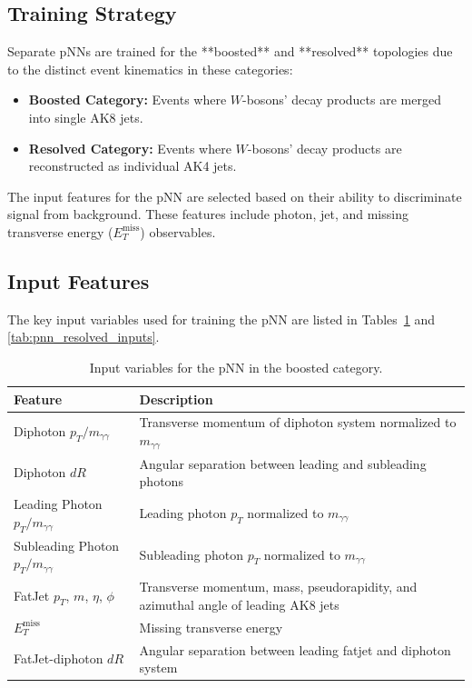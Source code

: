 \subsection{Training Strategy}
Separate pNNs are trained for the **boosted** and **resolved** topologies due to the distinct event kinematics in these categories:
\begin{itemize}
    \item \textbf{Boosted Category:} Events where \(W\)-bosons' decay products are merged into single AK8 jets.
    \item \textbf{Resolved Category:} Events where \(W\)-bosons' decay products are reconstructed as individual AK4 jets.
\end{itemize}

The input features for the pNN are selected based on their ability to discriminate signal from background. These features include photon, jet, and missing transverse energy (\(E_T^{\text{miss}}\)) observables.

\subsection{Input Features}
The key input variables used for training the pNN are listed in Tables~\ref{tab:pnn_boosted_inputs} and \ref{tab:pnn_resolved_inputs}.

\begin{table}[h!]
    \centering
    \caption{Input variables for the pNN in the boosted category.}
    \label{tab:pnn_boosted_inputs}
    \begin{tabular}{ll}
        \hline
        \textbf{Feature} & \textbf{Description} \\
        \hline
        Diphoton \(p_T/m_{\gamma\gamma}\) & Transverse momentum of diphoton system normalized to \(m_{\gamma\gamma}\) \\
        Diphoton \(dR\) & Angular separation between leading and subleading photons \\
        Leading Photon \(p_T/m_{\gamma\gamma}\) & Leading photon \(p_T\) normalized to \(m_{\gamma\gamma}\) \\
        Subleading Photon \(p_T/m_{\gamma\gamma}\) & Subleading photon \(p_T\) normalized to \(m_{\gamma\gamma}\) \\
        FatJet \(p_T\), \(m\), \(\eta\), \(\phi\) & Transverse momentum, mass, pseudorapidity, and azimuthal angle of leading AK8 jets \\
        \(E_T^{\text{miss}}\) & Missing transverse energy \\
        FatJet-diphoton \(dR\) & Angular separation between leading fatjet and diphoton system \\
        \hline
    \end{tabular}
\end{table}

